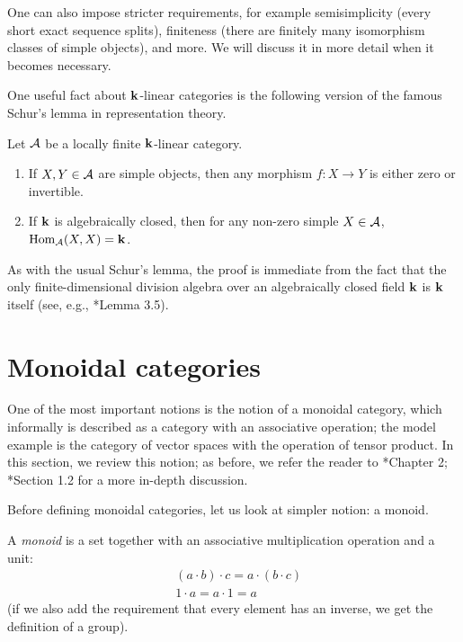 One can also impose stricter requirements, for example semisimplicity (every
short exact sequence splits), finiteness (there are finitely many isomorphism
classes of simple objects), and more. We will discuss it in more detail when it
becomes necessary.

One useful fact about $\mathbf{k}$-linear categories is the following version of the
famous Schur's lemma in representation theory.

\begin{lemma}\label{l:schur}
  Let $\mathcal{A}$ be a locally finite $\mathbf{k}$-linear category.
  \begin{enumerate}
    \item If $X,Y\in \mathcal{A}$ are simple objects, then any morphism
      $f\colon X\to Y$ is either zero or invertible.
    \item If $\mathbf{k}$ is algebraically closed, then for any non-zero
      simple $X\in \mathcal{A}$, $\operatorname{Hom}_{\mathcal{A}}(X,X)=\mathbf{k}$.
  \end{enumerate}
\end{lemma}
As with the usual Schur's lemma, the proof is immediate from the fact that the
only  finite-dimensional division algebra over an algebraically closed field
$\mathbf{k}$ is $\mathbf{k}$ itself (see, e.g., *{Lemma 3.5}).

\section{Monoidal categories}\label{s:monoidal}
One of the most important notions is the notion of a monoidal category, which
informally is described as a category with an associative operation; the model
example is the category of vector spaces with the operation of tensor product.
In this section, we review this notion; as before, we refer the reader to
*{Chapter 2}; *{Section 1.2} for a more
in-depth discussion.

Before defining monoidal categories, let us look at simpler notion: a monoid.

A \emph{monoid} is a set together with an associative
multiplication operation and a unit:
\begin{align*}
  &(a\cdot b)\cdot c = a\cdot (b\cdot c)\\
  &1\cdot a = a\cdot 1 = a
\end{align*}
(if we also add the requirement that every element has an inverse,
we get the definition of a group).

